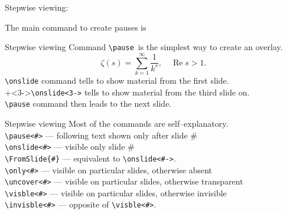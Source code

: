 \graphicspath{{sec02/images/}{sec02/code/}}
\lstset{inputpath=sec02/code/}

\begin{frame}[fragile]{Stepwise viewing: \ccol\pause \preMagicPage}

    The \inpause main \inpause command \inpause to create \inpause pauses \inpause is \ccol\pause
\end{frame}

\begin{frame}[fragile]{Stepwise viewing\magicPage}
    Command \lstinline[basicstyle=\tt]|\pause|\pause\
    is the simplest way to create an overlay.
    \pause
    \[
        \zeta(s) = \sum^{\infty}_{k=1}{\frac{1}{k^s}},  \quad  \operatorname{Re}s > 1.
    \]
    \onslide\lstinline[basicstyle=\tt]|\onslide| command tells to show material from the first slide.\\
    \onslide+<3->\lstinline[basicstyle=\tt]|\onslide<3->| tells to show material from the third slide on.\\ 
    \pause \lstinline[basicstyle=\tt]|\pause| command then leads to the next slide.
\end{frame}

\begin{frame}[fragile]{Stepwise viewing\magicPage}
    Most of the commands are self--explanatory.\\
    \lstinline[basicstyle=\tt]|\pause<#>| --- following text shown only after slide \#  \\
    \lstinline[basicstyle=\tt]|\onslide<#>|  --- visible only slide \#\\
    \lstinline[basicstyle=\tt]|\FromSlide{#}| --- equivalent to \lstinline[basicstyle=\tt]|\onslide<#->|. \\
    \lstinline[basicstyle=\tt]|\only<#>| --- visible on particular slides, otherwise absent  \\
    \lstinline[basicstyle=\tt]|\uncover<#>| --- visible on particular slides, otherwise transparent \\
    \lstinline[basicstyle=\tt]|\visble<#>|  --- visible on particular slides, otherwise invisible  \\
    \lstinline[basicstyle=\tt]|\invisble<#>| --- opposite of \lstinline[basicstyle=\tt]|\visble<#>|. \\
\end{frame}

